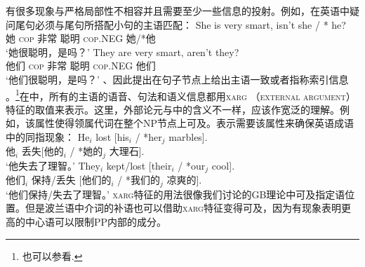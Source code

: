 有很多现象与严格局部性不相容并且需要至少一些信息的投射。例如，在英语中疑问尾句必须与尾句所搭配小句的主语匹配：
\eal
\ex 
\gll She is very smart, isn't she / * he?\\
	 她 \textsc{cop} 非常 聪明 \textsc{cop}.NEG 她/*他\\
\glt `她很聪明，是吗？'
\ex 
\gll They are very smart, aren't they?\\
	 他们 \textsc{cop} 非常 聪明 \textsc{cop}.NEG 他们\\
\glt `他们很聪明，是吗？'
\zl
\citet{BF99a}、\citet{FB2003a}因此提出在句子节点上给出主语一致或者指称索引信息 。\footnote{
  也可以参看.
}在\citet{Sag2007a}中，所有的主语的语音、句法和语义信息都用\textsc{xarg} （\textsc{external argument}）特征的取值来表示。这里，外部论元与\gbtc 中的含义不一样，应该作宽泛的理解。例如，该属性使得领属代词在整个NP节点上可及。\citet{Sag2007a}表示需要该属性来确保英语成语中的同指现象：
\eal
\ex 
\gll He$_i$ lost [his$_i$ / *her$_j$ marbles].\\
	 他$_i$ 丢失[他的$_i$ / *她的$_j$ 大理石].\\
\glt `他失去了理智。'
\ex 
\gll They$_i$ kept/lost [their$_i$ / *our$_j$ cool].\\
	 他们$_i$ 保持/丢失 [他们的$_i$ / *我们的$_j$ 凉爽的].\\
\glt `他们保持/失去了理智。'
\zl
\addlines
\textsc{xarg}特征的用法很像我们讨论的GB理论中可及指定语位置。但是波兰语中介词的补语也可以借助\textsc{xarg}特征变得可及，因为有现象表明更高的中心语可以限制PP内部的成分\citep[\S~5.4.1.2]{Prze99b}。

